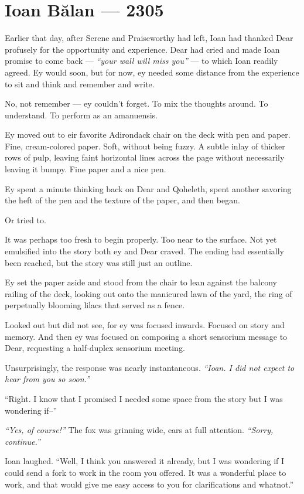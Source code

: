 \hypertarget{ioan-bux103lan-2305}{%
\chapter*{Ioan Bălan — 2305}\label{ioan-bux103lan-2305}}

Earlier that day, after Serene and Praiseworthy had left, Ioan had thanked Dear profusely for the opportunity and experience. Dear had cried and made Ioan promise to come back — \emph{``your wall will miss you''} — to which Ioan readily agreed. Ey would soon, but for now, ey needed some distance from the experience to sit and think and remember and write.

No, not remember — ey couldn't forget. To mix the thoughts around. To understand. To perform as an amanuensis.

Ey moved out to eir favorite Adirondack chair on the deck with pen and paper. Fine, cream-colored paper. Soft, without being fuzzy. A subtle inlay of thicker rows of pulp, leaving faint horizontal lines across the page without necessarily leaving it bumpy. Fine paper and a nice pen.

Ey spent a minute thinking back on Dear and Qoheleth, spent another savoring the heft of the pen and the texture of the paper, and then began.

Or tried to.

It was perhaps too fresh to begin properly. Too near to the surface. Not yet emulsified into the story both ey and Dear craved. The ending had essentially been reached, but the story was still just an outline.

Ey set the paper aside and stood from the chair to lean against the balcony railing of the deck, looking out onto the manicured lawn of the yard, the ring of perpetually blooming lilacs that served as a fence.

Looked out but did not see, for ey was focused inwards. Focused on story and memory. And then ey was focused on composing a short sensorium message to Dear, requesting a half-duplex sensorium meeting.

Unsurprisingly, the response was nearly instantaneous. \emph{``Ioan. I did not expect to hear from you so soon.''}

``Right. I know that I promised I needed some space from the story but I was wondering if--''

\emph{``Yes, of course!''} The fox was grinning wide, ears at full attention. \emph{``Sorry, continue.''}

Ioan laughed. ``Well, I think you answered it already, but I was wondering if I could send a fork to work in the room you offered. It was a wonderful place to work, and that would give me easy access to you for clarifications and whatnot.''


